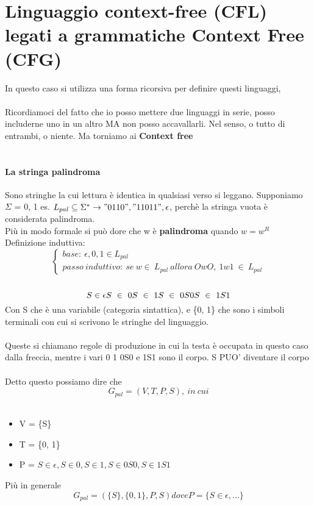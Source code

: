 \documentclass[12pt, a4paper, openany, oneside]{book}
\begin{document}
\section{Linguaggio context-free (CFL) legati a grammatiche Context Free (CFG)}
In questo caso si utilizza una forma ricorsiva per definire questi linguaggi,
\\ \\
Ricordiamoci del fatto che io posso mettere due linguaggi in serie, posso 
includerne uno in un altro MA non posso accavallarli. Nel senso, o tutto di 
entrambi, o niente. Ma torniamo ai \textbf{Context free}
\\ \\
\paragraph{La stringa palindroma}
Sono stringhe la cui lettura è identica in qualsiasi verso si leggano. Supponiamo
$\Sigma$ = {0, 1} es. $L_{pal} \subseteq \Sigma ^{*} \to "0110", "11011", 
\epsilon$, perchè la stringa vuota è considerata palindroma. \\ 
Più in modo formale si può dore che w è \textbf{palindroma} quando $w = w^{R}$
Definizione induttiva:
$$
\begin{cases}
base:~\epsilon, 0, 1 \in L_{pal} \\
passo~induttivo:~ se ~w\in ~L_{pal} ~allora ~OwO, ~1w1 ~\in ~L_{pal}
\end{cases}
$$
\\
$$
S \in \epsilon\\
S ~ \in ~ 0 \\
S ~ \in ~ 1 \\
S ~ \in ~ 0S0 \\
S ~ \in ~ 1S1$$
Con S che è una variabile (categoria sintattica), e \{0, 1\} che sono i simboli
terminali con cui si scrivono le stringhe del linguaggio.\\ \\
Queste si chiamano regole di produzione in cui la testa è occupata in questo
caso dalla freccia, mentre i vari 0 1 0S0 e 1S1 sono il corpo. S PUO' diventare
il corpo \\ \\ 
Detto questo possiamo dire che
$$G_{pal} = (V, T, P, S), ~in ~cui $$\\
\begin{itemize}
	\item V = \{S\}
	\item T = \{0, 1\}
	\item P = $S \in \epsilon, S \in 0, S \in 1, S \in 0S0, S \in 1S1$
\end{itemize}
Più in generale
$$G_{pal} = (\{S\},\{0, 1\}, P, S) dove P = \{S \in \epsilon, ...\}$$
\end{document}
